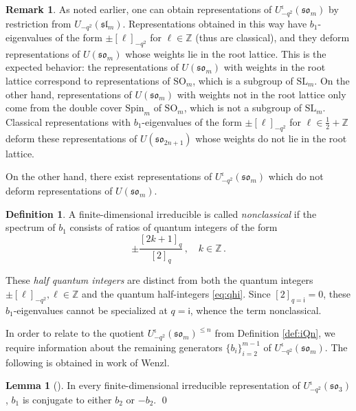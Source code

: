 \documentclass[10pt]{amsart}
\numberwithin{equation}{section}
\theoremstyle{definition}
\newtheorem{lem}[thm]{Lemma}
\newtheorem{rem}[thm]{Remark}
\newtheorem{defn}[thm]{Definition}
\def\Z{{\mathbb Z}}
\newcommand{\slm}{\mathfrak{sl}_{m}}
\newcommand{\son}[1][2n+1]{\mathfrak{so}_{#1}}
\newcommand{\som}[1][m]{\mathfrak{so}_{#1}}
\newcommand{\iqUsom}[1][m]{{U}^{\iota}_{-q^2}(\som[#1])}
\begin{document}
\begin{rem}\label{rem:moreclassical}
As noted earlier, one can obtain representations of $\iqUsom$ by restriction from $U_{-q^2}(\slm)$. 
Representations obtained in this way have $b_1$-eigenvalues of the form $\pm [\ell]_{-q^2}$ for $\ell \in \mathbb{Z}$ 
(thus are classical), and they deform representations of $U(\som)$ whose weights lie in the root lattice. 
This is the expected behavior: 
the representations of $U(\som)$ with weights in the root lattice correspond to representations of $\mathrm{SO}_m$, 
which is a subgroup of $\mathrm{SL}_m$. 
On the other hand, representations of $U(\som)$ with weights not in the root lattice only come from 
the double cover $\mathrm{Spin}_m$ of $\mathrm{SO}_m$, which is not a subgroup of $\mathrm{SL}_m$. 
Classical representations with $b_1$-eigenvalues of the form $\pm [\ell]_{-q^2}$ for $\ell \in \frac{1}{2} + \mathbb{Z}$ 
deform these representations of $U(\son)$ whose weights do not lie in the root lattice. 
\end{rem}

On the other hand, there exist representations of $\iqUsom$ which do not deform representations of $U(\som)$. 

\begin{defn}\label{defn:nonclassical}
A finite-dimensional irreducible is called \emph{nonclassical} if 
the spectrum of $b_1$ consists of ratios of quantum integers of the form
\begin{equation}\label{eqn:no-class-spec}
\pm \frac{[2k+1]_q}{[2]_q} \, , \quad k \in \mathbb{Z} \, .
\end{equation}
\end{defn}

These \emph{half quantum integers} are distinct from both the quantum integers $\pm [\ell]_{-q^2}, \ell \in \Z$
and the quantum half-integers \eqref{eq:qhi}. 
Since $[2]_{q=\mathsf{i}} = 0$, these $b_1$-eigenvalues cannot be specialized at $q= \mathsf{i}$,
whence the term nonclassical.

In order to relate to the quotient $\iqUsom^{\le n}$ from Definition \ref{def:iQn}, 
we require information about the remaining generators $\{b_i\}_{i=2}^{m-1}$ of $\iqUsom$. 
The following is obtained in work of Wenzl.

\begin{lem}[{\cite[Theorem 3.11, part (d)]{WenzlUprime}}]\label{lem:Wenzlso3}
In every finite-dimensional irreducible representation of $\iqUsom[3]$, 
$b_1$ is conjugate to either $b_2$ or $-b_2$. \qed
	\end{lem}
	
\end{document}
